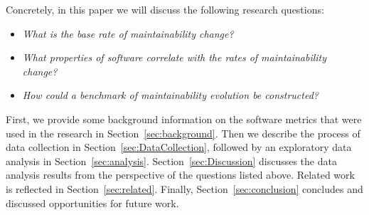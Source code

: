 Concretely, in this paper we will discuss the following research questions:
\begin{itemize}
\item \textit{What is the base rate of maintainability change?}
\item \textit{What properties of software correlate with the rates of maintainability change?}
\item \textit{How could a benchmark of maintainability evolution be constructed?}
\end{itemize}

First, we provide some background information on the software metrics that were used in the research in Section~\ref{sec:background}. Then we describe the process of data collection in Section~\ref{sec:DataCollection}, followed by an exploratory data analysis in Section~\ref{sec:analysis}. Section~\ref{sec:Discussion} discusses the data analysis results from the perspective of the questions listed above. Related work is reflected in Section~\ref{sec:related}. Finally, Section~\ref{sec:conclusion} concludes and discussed opportunities for future work.

